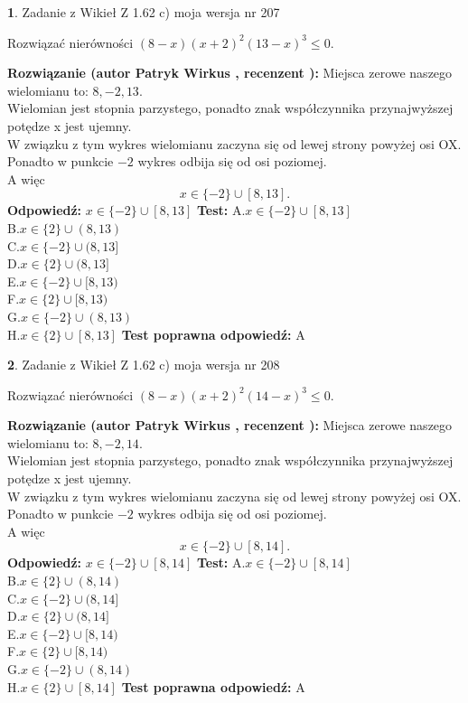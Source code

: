 \documentclass[12pt, a4paper]{article}
\theoremstyle{definition} %
\newtheorem{zad}{}
\newcommand{\zadStart}[1]{\begin{zad}#1\newline}
\newcommand{\zadStop}{\end{zad}}
\newcommand{\rozwStart}[2]{\noindent \textbf{Rozwiązanie (autor #1 , recenzent #2): }\newline}
\newcommand{\rozwStop}{\newline}
\newcommand{\odpStart}{\noindent \textbf{Odpowiedź:}\newline}
\newcommand{\odpStop}{\newline}
\newcommand{\testStart}{\noindent \textbf{Test:}\newline}
\newcommand{\testStop}{\newline}
\newcommand{\kluczStart}{\noindent \textbf{Test poprawna odpowiedź:}\newline}
\newcommand{\kluczStop}{\newline}
\begin{document}
\zadStart{Zadanie z Wikieł Z 1.62 c) moja wersja nr 207}

Rozwiązać nierówności $(8-x)(x+2)^{2}(13-x)^{3}\le0$.
\zadStop
\rozwStart{Patryk Wirkus}{}
Miejsca zerowe naszego wielomianu to: $8, -2, 13$.\\
Wielomian jest stopnia parzystego, ponadto znak współczynnika przy\linebreak najwyższej potędze x jest ujemny.\\ W związku z tym wykres wielomianu zaczyna się od lewej strony powyżej osi OX.\\
Ponadto w punkcie $-2$ wykres odbija się od osi poziomej.\\
A więc $$x \in \{-2\} \cup [8,13].$$
\rozwStop
\odpStart
$x \in \{-2\} \cup [8,13]$
\odpStop
\testStart
A.$x \in \{-2\} \cup [8,13]$\\
B.$x \in \{2\} \cup (8,13)$\\
C.$x \in \{-2\} \cup (8,13]$\\
D.$x \in \{2\} \cup (8,13]$\\
E.$x \in \{-2\} \cup [8,13)$\\
F.$x \in \{2\} \cup [8,13)$\\
G.$x \in \{-2\} \cup (8,13)$\\
H.$x \in \{2\} \cup [8,13]$
\testStop
\kluczStart
A
\kluczStop



\zadStart{Zadanie z Wikieł Z 1.62 c) moja wersja nr 208}

Rozwiązać nierówności $(8-x)(x+2)^{2}(14-x)^{3}\le0$.
\zadStop
\rozwStart{Patryk Wirkus}{}
Miejsca zerowe naszego wielomianu to: $8, -2, 14$.\\
Wielomian jest stopnia parzystego, ponadto znak współczynnika przy\linebreak najwyższej potędze x jest ujemny.\\ W związku z tym wykres wielomianu zaczyna się od lewej strony powyżej osi OX.\\
Ponadto w punkcie $-2$ wykres odbija się od osi poziomej.\\
A więc $$x \in \{-2\} \cup [8,14].$$
\rozwStop
\odpStart
$x \in \{-2\} \cup [8,14]$
\odpStop
\testStart
A.$x \in \{-2\} \cup [8,14]$\\
B.$x \in \{2\} \cup (8,14)$\\
C.$x \in \{-2\} \cup (8,14]$\\
D.$x \in \{2\} \cup (8,14]$\\
E.$x \in \{-2\} \cup [8,14)$\\
F.$x \in \{2\} \cup [8,14)$\\
G.$x \in \{-2\} \cup (8,14)$\\
H.$x \in \{2\} \cup [8,14]$
\testStop
\kluczStart
A
\kluczStop
\end{document}
